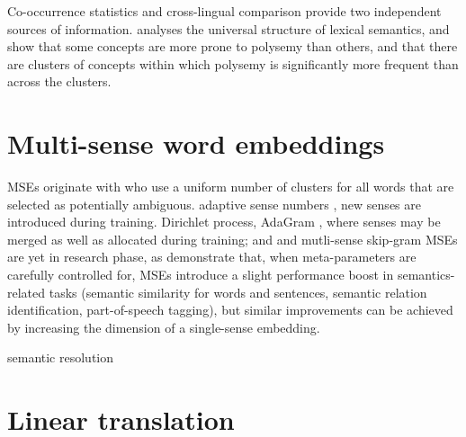 \documentclass[11pt]{article}
\begin{document}
Co-occurrence statistics and cross-lingual comparison provide two independent sources of information.
\citet{Youn:2016} analyses the universal structure of lexical semantics, and show
that some concepts are more prone to polysemy than others, and that there are
clusters of concepts within which polysemy is significantly more frequent
than across the clusters. 
\section{Multi-sense word embeddings}

MSEs originate with \cite{Reisinger:2010,Huang:2012} who use a uniform number
of clusters for all words that are selected as potentially ambiguous.  adaptive
sense numbers \citep{Neelakantan:2014}, new senses are introduced during
training.  Dirichlet process, AdaGram \citep{Bartunov:2015}, where senses may
be merged as well as allocated during training; and and mutli-sense skip-gram
\citep{Li:2015}
MSEs are yet in research phase, as \cite{Li:2015}  demonstrate that, when
meta-parameters are carefully controlled for, MSEs introduce a slight
performance boost in semantics-related tasks (semantic similarity for words and
sentences, semantic relation identification, part-of-speech tagging), but
similar improvements can be achieved by increasing the dimension of a
single-sense embedding.

semantic resolution

\section{Linear translation}
\end{document}
